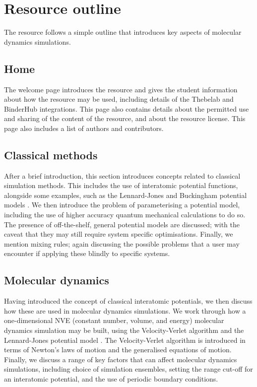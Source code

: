 \documentclass[amsmath,amssymb,twocolumn,superscriptaddress]{revtex4-1}
\begin{document}
\section{Resource outline}

The resource follows a simple outline that introduces key aspects of molecular dynamics simulations.

\subsection{Home}

The welcome page introduces the resource and gives the student information about how the resource may be used, including details of the Thebelab and BinderHub integrations.
This page also contains details about the permitted use and sharing of the content of the resource, and about the resource license.
This page also includes a list of authors and contributors.

\subsection{Classical methods}

After a brief introduction, this section introduces concepts related to classical simulation methods.
This includes the use of interatomic potential functions, alongside some examples, such as the Lennard-Jones and Buckingham potential models \cite{lennard-jones_determination_1924,buckingham_classical_1938}.
We then introduce the problem of parameterising a potential model, including the use of higher accuracy quantum mechanical calculations to do so.
The presence of off-the-shelf, general potential models are discussed; with the caveat that they may still require system specific optimisations.
Finally, we mention mixing rules; again discussing the possible problems that a user may encounter if applying these blindly to specific systems.

\subsection{Molecular dynamics}

Having introduced the concept of classical interatomic potentials, we then discuss how these are used in molecular dynamics simulations.
We work through how a one-dimensional NVE (constant number, volume, and energy) molecular dynamics simulation may be built, using the Velocity-Verlet algorithm and the Lennard-Jones potential model \cite{swope_computer_1982,lennard-jones_determination_1924}.
The Velocity-Verlet algorithm is introduced in terms of Newton's laws of motion and the generalised equations of motion.
Finally, we discuss a range of key factors that can affect molecular dynamics simulations, including choice of simulation ensembles, setting the range cut-off for an interatomic potential, and the use of periodic boundary conditions.
\end{document}
